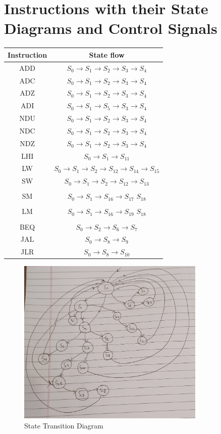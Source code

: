 \documentclass[]{report}
\begin{document}
    \section*{Instructions with their State Diagrams and Control Signals}
        \begin{center}
            \begin{tabular}{|c|c|}
                \hline
                Instruction & State flow\\
                \hline
                ADD & $S_0 \to S_1 \to S_2 \to S_3 \to S_4$\\
                ADC & $S_0 \to S_1 \to S_2 \to S_3 \to S_4$\\
                ADZ & $S_0 \to S_1 \to S_2 \to S_3 \to S_4$\\
                ADI & $S_0 \to S_1 \to S_5 \to S_3 \to S_4$\\
                NDU & $S_0 \to S_1 \to S_2 \to S_3 \to S_4$\\
                NDC & $S_0 \to S_1 \to S_2 \to S_3 \to S_4$\\
                NDZ & $S_0 \to S_1 \to S_2 \to S_3 \to S_4$\\
                LHI & $S_0 \to S_1 \to S_{11}$\\
                LW & $S_0 \to S_1 \to S_2 \to S_{12} \to S_{14} \to S_{15}$\\
                SW & $S_0 \to S_1 \to S_2 \to S_{12} \to S_{13}$\\
                & \\
                SM & $S_0 \to S_1 \to S_{16} \to S_{17} $  $ S_{18}$\\
                & \\
                LM & $S_0 \to S_1 \to S_{16} \to S_{19} $  $ S_{18}$\\
                & \\
                BEQ & $S_0 \to S_2 \to S_6 \to S_7$\\
                JAL & $S_0 \to S_8 \to S_9$\\
                JLR & $S_0 \to S_8 \to S_{10}$\\
                \hline
            \end{tabular}
        \end{center} 
        \begin{figure}[H]
            \begin{center}
                \includegraphics*[width=0.8\textwidth]{StateDiagram.jpg}
                \caption{State Transition Diagram}
            \end{center}
        \end{figure}
            
\end{document}
